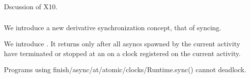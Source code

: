 Dscussion of X10.

\subsubsection{}

We introduce a new derivative synchronization concept, that of syncing.

We introduce . It returns only after all asyncs
spawned by the current activity have terminated or stopped at an
 on a clock registered on the current activity.

Programs using finish/async/at/atomic/clocks/Runtime.sync() cannot deadlock.

